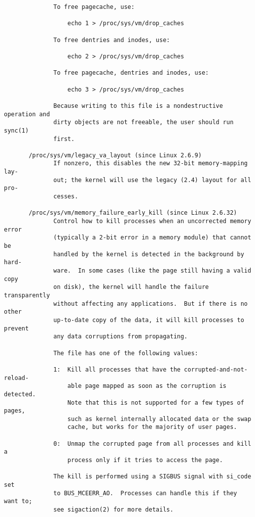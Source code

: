 \documentclass[]{article}
\begin{document}
\begin{verbatim}
              To free pagecache, use:

                  echo 1 > /proc/sys/vm/drop_caches

              To free dentries and inodes, use:

                  echo 2 > /proc/sys/vm/drop_caches

              To free pagecache, dentries and inodes, use:

                  echo 3 > /proc/sys/vm/drop_caches

              Because writing to this file is a nondestructive operation and
              dirty objects are not freeable, the user should run sync(1)
              first.

       /proc/sys/vm/legacy_va_layout (since Linux 2.6.9)
              If nonzero, this disables the new 32-bit memory-mapping lay‐
              out; the kernel will use the legacy (2.4) layout for all pro‐
              cesses.

       /proc/sys/vm/memory_failure_early_kill (since Linux 2.6.32)
              Control how to kill processes when an uncorrected memory error
              (typically a 2-bit error in a memory module) that cannot be
              handled by the kernel is detected in the background by hard‐
              ware.  In some cases (like the page still having a valid copy
              on disk), the kernel will handle the failure transparently
              without affecting any applications.  But if there is no other
              up-to-date copy of the data, it will kill processes to prevent
              any data corruptions from propagating.

              The file has one of the following values:

              1:  Kill all processes that have the corrupted-and-not-reload‐
                  able page mapped as soon as the corruption is detected.
                  Note that this is not supported for a few types of pages,
                  such as kernel internally allocated data or the swap
                  cache, but works for the majority of user pages.

              0:  Unmap the corrupted page from all processes and kill a
                  process only if it tries to access the page.

              The kill is performed using a SIGBUS signal with si_code set
              to BUS_MCEERR_AO.  Processes can handle this if they want to;
              see sigaction(2) for more details.


\end{verbatim}
\end{document}
